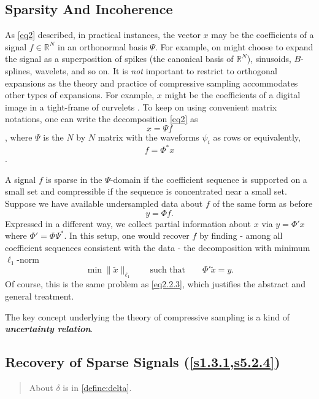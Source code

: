 \subsection{Sparsity And Incoherence}
As \cref{eq2} described, in practical instances, the vector $x$ may be the coefficients of a signal $f \in \mathbb{R}^N$ in an orthonormal basis $\Psi$. For example, on might choose to expand the signal as a superposition of spikes (the canonical basis of $\mathbb{R}^N$), sinusoids, $B$-splines, wavelets, and so on. It is \emph{\textcolor[rgb]{1,0,0}{not}} important to restrict to orthogonal expansions as the theory and practice of compressive sampling accommodates other types of expansions. For example, $x$ might be the coefficients of a digital image in a tight-frame of curvelets \cite{2-5}. To keep on using convenient matrix notations, one can write the decomposition \cref{eq2} as 
\[x=\Psi f\],
where $\Psi$ is the $N$ by $N$ matrix with the waveforms $\psi_i$ as rows or equivalently,
\[f=\Phi^* x\].

A signal $f$ is sparse in the $\Psi$-domain if the coefficient sequence is supported on a small set and compressible if the sequence is concentrated near a small set. Suppose we have available undersampled data about $f$ of the same form as before
\[y=\Phi f.\]
Expressed in a different way, we collect partial information about $x$ via $y=\Phi'x$ where $\Phi'=\Phi\Psi^{*}$. In this setup, one would recover $f$ by finding - among all coefficient sequences consistent with the data - the decomposition with minimum $\ell_1$-norm
\[
\min\|\tilde{x}\|_{\ell_1} \qquad \text{such that} \qquad \Phi' \tilde{x}=y.
\]
Of course, this is the same problem as \cref{eq2.2.3}, which justifies the abstract and general treatment. 

The key concept underlying the theory of compressive sampling is a kind of \emph{\textcolor[rgb]{1,0,0}{\textbf{uncertainty relation}}}.

\subsection{Recovery of Sparse Signals (\cref{s1.3.1,s5.2.4})}
\label{s2.3.2}

\begin{quote}
    \textcolor[rgb]{1,0,0}{About $\delta$ is in \cref{define:delta}}.
\end{quote}

